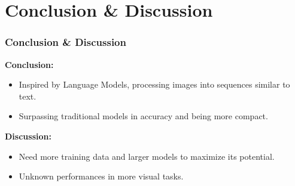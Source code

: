 \documentclass{beamer}
\begin{document}
\section{Conclusion \& Discussion}
\begin{frame}
\frametitle{Conclusion \& Discussion}

\textbf{Conclusion:}

\begin{itemize}
	\item Inspired by Language Models, processing images into sequences similar to text.
	\item Surpassing traditional models in accuracy and being more compact.
\end{itemize}

\bigskip
\bigskip

\textbf{Discussion:}

\begin{itemize}
	\item Need more training data and larger models to maximize its potential.
	\item Unknown performances in more visual tasks.
\end{itemize}

\end{frame}
\end{document}
